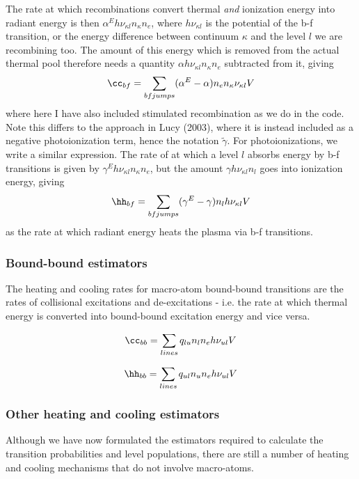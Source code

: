 The rate at which recombinations convert
thermal {\em and} ionization energy into radiant energy is then
$\alpha^E h\nu_{\kappa l} n_\kappa n_e$, where $h \nu_{\kappa l}$ is the potential of the 
b-f transition, or the energy difference between continuum $\kappa$ and 
the level $l$ we are recombining too. 
The amount of this energy which is removed from the actual thermal pool
therefore needs a quantity $\alpha h\nu_{\kappa l} n_\kappa n_e$ subtracted from it,
giving
\begin{equation}
\cc_{bf} = \sum_{bf jumps} (\alpha^E - \alpha) n_e n_{\kappa}\nu_{\kappa l} V 
\end{equation}
where here I have also included stimulated recombination as we do in the code. Note
this differs to the approach in Lucy (2003), where it is instead included as a 
negative photoionization term, hence the notation $\widetilde{\gamma}$.
For photoionizations, we write a similar expression. The rate of at which
a level $l$ absorbs energy by b-f transitions is given by $\gamma^E h\nu_{\kappa l} n_\kappa n_e$,
but the amount $\gamma h \nu_{\kappa l} n_l$ goes into ionization energy, giving 
\begin{equation}
\hh_{bf} = \sum_{bf jumps} (\gamma^E - \gamma) n_l h \nu_{\kappa l} V
\end{equation}
as the rate at which radiant energy heats the plasma via b-f transitions.

\subsubsection{Bound-bound estimators}
The heating and cooling rates for macro-atom bound-bound transitions are the rates of
collisional excitations and de-excitations
- i.e. the rate at which thermal energy is converted into
bound-bound excitation energy and vice versa.

\begin{equation}
\cc_{bb} = \sum_{lines} q_{lu} n_l n_e h \nu_{ul} V
\end{equation}

\begin{equation}
\hh_{bb} = \sum_{lines} q_{ul} n_u n_e h \nu_{ul} V
\end{equation}


\subsubsection{Other heating and cooling estimators}
Although we have now formulated the estimators required to calculate the 
transition probabilities and level populations, there are still a number of 
heating and cooling mechanisms that do not involve macro-atoms. 

